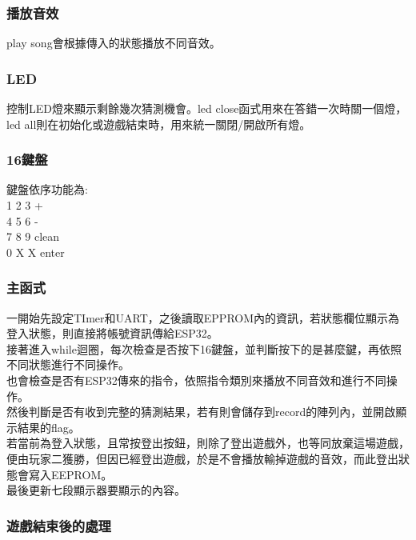 \documentclass{scrartcl}
\begin{document}
\subsubsection{播放音效}


play song會根據傳入的狀態播放不同音效。

\subsubsection{LED}


控制LED燈來顯示剩餘幾次猜測機會。led close函式用來在答錯一次時關一個燈，led all則在初始化或遊戲結束時，用來統一關閉/開啟所有燈。

\subsubsection{16鍵盤}

鍵盤依序功能為: \\
1  2  3  +\\
4  5  6  -\\
7  8  9  clean\\
0  X  X  enter

\subsubsection{主函式}

一開始先設定TImer和UART，之後讀取EPPROM內的資訊，若狀態欄位顯示為登入狀態，則直接將帳號資訊傳給ESP32。\\
接著進入while迴圈，每次檢查是否按下16鍵盤，並判斷按下的是甚麼鍵，再依照不同狀態進行不同操作。\\
也會檢查是否有ESP32傳來的指令，依照指令類別來播放不同音效和進行不同操作。\\
然後判斷是否有收到完整的猜測結果，若有則會儲存到record的陣列內，並開啟顯示結果的flag。\\
若當前為登入狀態，且常按登出按鈕，則除了登出遊戲外，也等同放棄這場遊戲，便由玩家二獲勝，但因已經登出遊戲，於是不會播放輸掉遊戲的音效，而此登出狀態會寫入EEPROM。\\
最後更新七段顯示器要顯示的內容。

\subsubsection{遊戲結束後的處理}

\end{document}
